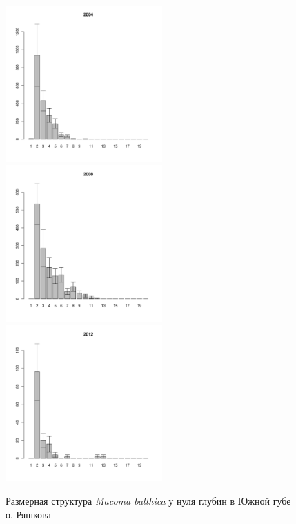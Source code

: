 \begin{figure}[h]
\begin{multicols}{3}
\hfill
\includegraphics[width=60mm]{../White_Sea/Ryashkov_YuG/YuG_2004_.pdf}
\hfill
\includegraphics[width=60mm]{../White_Sea/Ryashkov_YuG/YuG_2008_.pdf}
\hfill
\includegraphics[width=60mm]{../White_Sea/Ryashkov_YuG/YuG_2012_.pdf}
\end{multicols}


\caption{Размерная структура {\it Macoma balthica} у нуля глубин в Южной губе о. Ряшкова}
\label{ris:size_str_YuG}
\end{figure}


